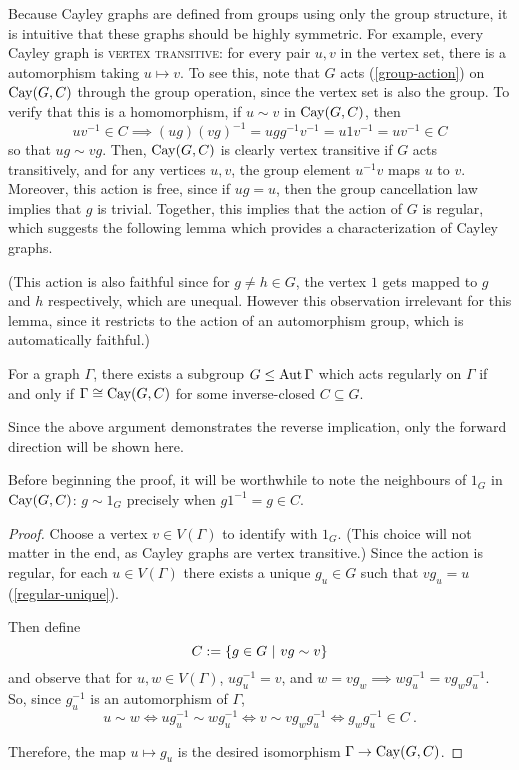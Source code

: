\documentclass{report}
\begin{document}
    Because Cayley graphs are defined from groups using only the group
    structure, it is intuitive that these graphs should be highly symmetric.
    For example, every Cayley graph is \textsc{vertex transitive}: for every
    pair $u, v$ in the vertex set, there is a automorphism taking $u \mapsto v$.
    To see this, note that $G$ acts (\ref{group-action}) on $\operatorname{Cay}(G, C)$ through
    the group operation, since the vertex set is also the group.
    To verify that this is a homomorphism, if $u \sim v$ in $\operatorname{Cay}(G, C)$, then 
    $$
      uv^{-1} \in C
      \implies (ug)(vg)^{-1} = ugg^{-1}v^{-1} = u 1 v^{-1} = u v^{-1} \in C
    $$
    so that $ug \sim vg$.
    Then, $\operatorname{Cay}(G, C)$ is clearly vertex transitive if $G$ acts transitively,
    and for any vertices $u, v$, the group element $u^{-1} v$ maps $u$ to $v$.
    Moreover, this action is free, since if $ug = u$, then the group
    cancellation law implies that $g$ is trivial.
    Together, this implies that the action of $G$ is regular,
    which suggests the following lemma which provides a characterization of
    Cayley graphs.

    (This action is also faithful since for $g \neq h \in G$, the vertex $1$
    gets mapped to $g$ and $h$ respectively, which are unequal.  However this
    observation irrelevant for this lemma, since it restricts to the action of
    an automorphism group, which is automatically faithful.)

    \begin{lem}\label{regular-aut-cayley}
      For a graph $\Gamma$, there exists a subgroup $G \leq \operatorname{Aut} \Gamma$
      which acts regularly on $\Gamma$
      if and only if $\Gamma \cong \operatorname{Cay}(G, C)$
      for some inverse-closed $C \subseteq G$.
    \end{lem}

    Since the above argument demonstrates the reverse implication,
    only the forward direction will be shown here.

    Before beginning the proof, it will be worthwhile to note the neighbours
    of $1_G$ in $\operatorname{Cay}(G, C)$: $g \sim 1_G$ precisely when $g1^{-1} = g \in C$.

    \begin{proof}
      Choose a vertex $v \in V(\Gamma)$ to identify with $1_G$.  (This choice
      will not matter in the end, as Cayley graphs are vertex transitive.)
      Since the action is regular, for each $u \in V(\Gamma)$ there exists a
      unique $g_u \in G$ such that $vg_u = u$ (\ref{regular-unique}).

      Then define
      $$
        C := \left\lbrace  g \in G \ \middle| \ vg \sim v  \right\rbrace
      $$
      and observe that for $u, w \in V(\Gamma)$,
      $u g_u^{-1} = v$, and $w = v g_w \implies w g_u^{-1} = v g_w g_u^{-1}$.
      So, since $g_u^{-1}$ is an automorphism of $\Gamma$,
      $$
        u \sim w
        \iff u g_u^{-1} \sim w g_u^{-1}
        \iff v \sim v g_w g_u^{-1}
        \iff g_w g_u^{-1} \in C
        \ .
      $$

      Therefore, the map $u \mapsto g_u$ is the desired isomorphism $\Gamma \to
      \operatorname{Cay}(G, C)$.
    \end{proof}
\end{document}
